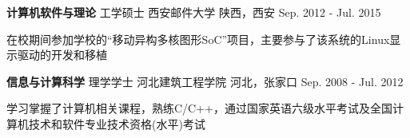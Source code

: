 
\begin{cventries}
  \cventry
    {\textbf{计算机软件与理论} \hspace{0.2cm} 工学硕士} %
    {西安邮件大学} %
    {陕西，西安} %
    {Sep. 2012 - Jul. 2015} %
    {
      \begin{cvitems} %
         \item {在校期间参加学校的“移动异构多核图形SoC”项目，主要参与了该系统的Linux显示驱动的开发和移植}
      \end{cvitems}
    }

  \cventry
    {\textbf{信息与计算科学} \hspace{0.2cm} 理学学士} %
    {河北建筑工程学院} %
    {河北，张家口} %
    {Sep. 2008 - Jul. 2012} %
    {
      \begin{cvitems} %
      \item {学习掌握了计算机相关课程，熟练C/C++，通过国家英语六级水平考试及全国计算机技术和软件专业技术资格(水平)考试}
      \end{cvitems}
    }
\end{cventries}
